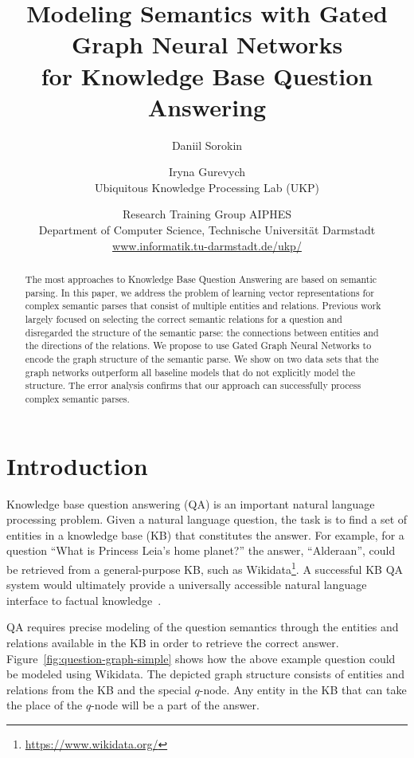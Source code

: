 \documentclass[11pt]{article}
\title{Modeling Semantics with Gated Graph Neural Networks \\ for Knowledge Base Question Answering}
\author{Daniil Sorokin \and Iryna Gurevych\\
Ubiquitous Knowledge Processing Lab (UKP) \and Research Training Group AIPHES \\
Department of Computer Science, 
Technische Universit\"at Darmstadt \\
  {\url{www.informatik.tu-darmstadt.de/ukp/}} \\ 
}
\date{}
\begin{document}
\maketitle

\begin{abstract}
The most approaches to Knowledge Base Question Answering are based on semantic parsing. In this paper, we address the problem of learning vector representations for complex semantic parses that consist of multiple entities and relations.
Previous work largely focused on selecting the correct semantic relations for a question and disregarded the structure of the semantic parse: the connections between entities and the directions of the relations.
We propose to use Gated Graph Neural Networks to encode the graph structure of the semantic parse. 
We show on two data sets that the graph networks outperform all baseline models that do not explicitly model the structure. The error analysis confirms that our approach can successfully  process complex  semantic parses.

\end{abstract}


\section{Introduction}

Knowledge base question answering (QA) is an important natural language processing problem. Given a natural language question, the task is to find a set of entities in a knowledge base (KB) that constitutes the answer. For example, for a question ``What is Princess Leia's home planet?'' the answer, ``Alderaan'', could be retrieved from a general-purpose KB, such as Wikidata\footnote{\url{https://www.wikidata.org/}}. A successful KB QA system would ultimately provide a universally accessible natural language interface to factual knowledge~\cite{Liang2016}.

QA requires precise modeling of the question semantics through the entities and relations available in the KB in order to retrieve the correct answer. Figure~\ref{fig:question-graph-simple} shows how the above example question could be modeled using Wikidata. The depicted graph structure consists of entities and relations from the KB and the special $q$-node. Any entity in the KB that can take the place of the $q$-node will be a part of the answer.
\end{document}
